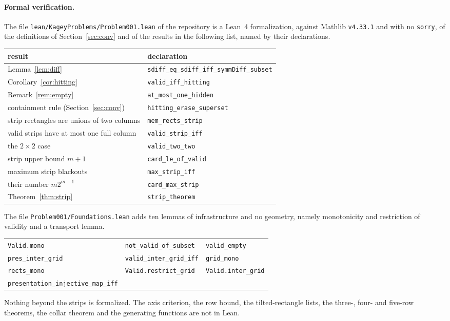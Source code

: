 \paragraph{Formal verification.} The file \texttt{lean/KageyProblems/Problem001.lean} of the
repository is a Lean~4 formalization, against Mathlib \texttt{v4.33.1} and with no
\texttt{sorry}, of the definitions of Section~\ref{sec:conv} and of the results in the
following list, named by their declarations.
\begin{center}\footnotesize
\begin{tabular}{@{}ll@{}}
\toprule
result & declaration \\
\midrule
Lemma~\ref{lem:diff} & \texttt{sdiff\_eq\_sdiff\_iff\_symmDiff\_subset} \\
Corollary~\ref{cor:hitting} & \texttt{valid\_iff\_hitting} \\
Remark~\ref{rem:empty} & \texttt{at\_most\_one\_hidden} \\
containment rule (Section~\ref{sec:conv}) & \texttt{hitting\_erase\_superset} \\
strip rectangles are unions of two columns & \texttt{mem\_rects\_strip} \\
valid strips have at most one full column & \texttt{valid\_strip\_iff} \\
the $2\times2$ case & \texttt{valid\_two\_two} \\
strip upper bound $m+1$ & \texttt{card\_le\_of\_valid} \\
maximum strip blackouts & \texttt{max\_strip\_iff} \\
their number $m2^{m-1}$ & \texttt{card\_max\_strip} \\
Theorem~\ref{thm:strip} & \texttt{strip\_theorem} \\
\bottomrule
\end{tabular}
\end{center}
The file \texttt{Problem001/Foundations.lean} adds ten lemmas of infrastructure and no
geometry, namely monotonicity and restriction of validity and a transport lemma.
\begin{center}\footnotesize
\begin{tabular}{@{}lll@{}}
\texttt{Valid.mono} & \texttt{not\_valid\_of\_subset} & \texttt{valid\_empty} \\
\texttt{pres\_inter\_grid} & \texttt{valid\_inter\_grid\_iff} & \texttt{grid\_mono} \\
\texttt{rects\_mono} & \texttt{Valid.restrict\_grid} & \texttt{Valid.inter\_grid} \\
\texttt{presentation\_injective\_map\_iff} & & \\
\end{tabular}
\end{center}
Nothing beyond the strips is formalized. The axis criterion, the row bound, the tilted-rectangle lists, the three-, four-
and five-row theorems, the collar theorem and the generating functions are not in Lean.

